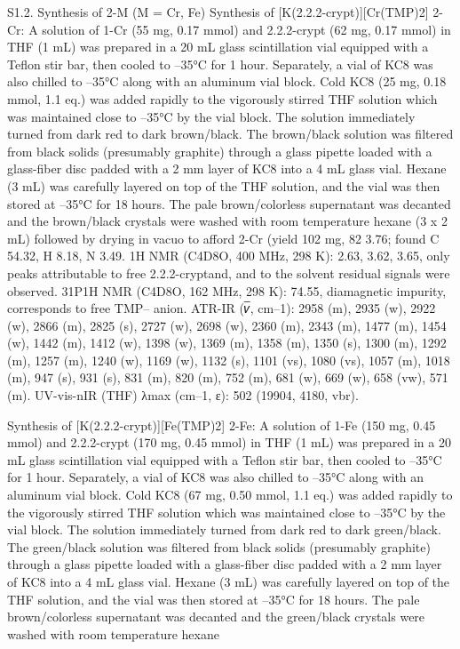 S1.2. Synthesis of 2-M (M = Cr, Fe) 
Synthesis of [K(2.2.2-crypt)][Cr(TMP)2] 2-Cr: A solution of 1-Cr (55 mg, 0.17 mmol) and 2.2.2-crypt (62 mg, 0.17 mmol) 
in THF (1 mL) was prepared in a 20 mL glass scintillation vial equipped with a Teflon stir bar, then cooled to –35°C for 1 
hour. Separately, a vial of KC8 was also chilled to –35°C along with an aluminum vial block. Cold KC8 (25 mg, 0.18 mmol, 
1.1 eq.) was added rapidly to the vigorously stirred THF solution which was maintained close to –35°C by the vial block. The 
solution immediately turned from dark red to dark brown/black. The brown/black solution was filtered from black solids 
(presumably graphite) through a glass pipette loaded with a glass-fiber disc padded with a 2 mm layer of KC8 into a 4 mL 
glass vial. Hexane (3 mL) was carefully layered on top of the THF solution, and the vial was then stored at –35°C for 18 hours. 
The pale brown/colorless supernatant was decanted and the brown/black crystals were washed with room temperature hexane 
(3 x 2 mL) followed by drying in vacuo to afford 2-Cr (yield 102 mg, 82%
3.76; found C 54.32, H 8.18, N 3.49. 1H NMR (C4D8O, 400 MHz, 298 K): 2.63, 3.62, 3.65, only peaks attributable to free 
2.2.2-cryptand, and to the solvent residual signals were observed. 31P{1H} NMR (C4D8O, 162 MHz, 298 K): 74.55, 
diamagnetic impurity, corresponds to free {TMP}– anion. ATR-IR (𝜈̅, cm–1): 2958 (m), 2935 (w), 2922 (w), 2866 (m), 2825 
(s), 2727 (w), 2698 (w), 2360 (m), 2343 (m), 1477 (m), 1454 (w), 1442 (m), 1412 (w), 1398 (w), 1369 (m), 1358 (m), 1350 
(s), 1300 (m), 1292 (m), 1257 (m), 1240 (w), 1169 (w), 1132 (s), 1101 (vs), 1080 (vs), 1057 (m), 1018 (m), 947 (s), 931 (s), 
831 (m), 820 (m), 752 (m), 681 (w), 669 (w), 658 (vw), 571 (m). UV-vis-nIR (THF) λmax (cm–1, ε): 502 (19904, 4180, vbr). 
 
Synthesis of [K(2.2.2-crypt)][Fe(TMP)2] 2-Fe: A solution of 1-Fe (150 mg, 0.45 mmol) and 2.2.2-crypt (170 mg, 0.45 mmol) 
in THF (1 mL) was prepared in a 20 mL glass scintillation vial equipped with a Teflon stir bar, then cooled to –35°C for 1 
hour. Separately, a vial of KC8 was also chilled to –35°C along with an aluminum vial block. Cold KC8 (67 mg, 0.50 mmol, 
1.1 eq.) was added rapidly to the vigorously stirred THF solution which was maintained close to –35°C by the vial block. The 
solution immediately turned from dark red to dark green/black. The green/black solution was filtered from black solids 
(presumably graphite) through a glass pipette loaded with a glass-fiber disc padded with a 2 mm layer of KC8 into a 4 mL 
glass vial. Hexane (3 mL) was carefully layered on top of the THF solution, and the vial was then stored at –35°C for 18 hours. 
The pale brown/colorless supernatant was decanted and the green/black crystals were washed with room temperature hexane 


